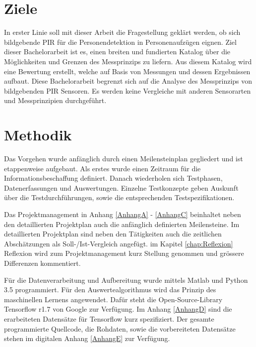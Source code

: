 \section{Ziele}
\label{sec:Einleitung}
In erster Linie soll mit dieser Arbeit die Fragestellung geklärt werden, ob sich bildgebende \ac{PIR} für die Personendetektion in Personenaufzügen eignen. Ziel dieser Bachelorarbeit ist es, einen breiten und fundierten Katalog über die Möglichkeiten und Grenzen des Messprinzips zu liefern. Aus diesem Katalog wird eine Bewertung erstellt, welche auf Basis von Messungen und dessen Ergebnissen aufbaut. Diese Bachelorarbeit begrenzt sich auf die Analyse des Messprinzips von bildgebenden \ac{PIR} Sensoren. Es werden keine Vergleiche mit anderen Sensorarten und Messprinzipien durchgeführt.

\section {Methodik}
\label{sec:Methodik}
Das Vorgehen wurde anfänglich durch einen Meilensteinplan gegliedert und ist etappenweise aufgebaut. Als erstes wurde einen Zeitraum für die Informationsbeschaffung definiert. Danach wiederholen sich Testphasen, Datenerfassungen und Auswertungen. Einzelne Testkonzepte geben Auskunft über die Testdurchführungen, sowie die entsprechenden Testspezifikationen. 

Das Projektmanagement in Anhang \ref{AnhangA} - \ref{AnhangC} beinhaltet neben den detaillierten Projektplan auch die anfänglich definierten Meilensteine. Im detaillierten Projektplan sind neben den Tätigkeiten auch die zeitlichen Abschätzungen als Soll-/Ist-Vergleich angefügt. im Kapitel \ref{chap:Reflexion} Reflexion wird zum Projektmanagement kurz Stellung genommen und grössere Differenzen kommentiert.

Für die Datenverarbeitung und Aufbereitung wurde mittels Matlab und Python 3.5 programmiert. Für den Auswertealgorithmus wird das Prinzip des maschinellen Lernens angewendet. Dafür steht die Open-Source-Library Tensorflow r1.7 von Google zur Verfügung. Im Anhang \ref{AnhangD} sind die erarbeiteten Datensätze für Tensorflow kurz spezifiziert. Der gesamte programmierte Quellcode, die Rohdaten, sowie die vorbereiteten Datensätze stehen im digitalen Anhang \ref{AnhangE} zur Verfügung. 


